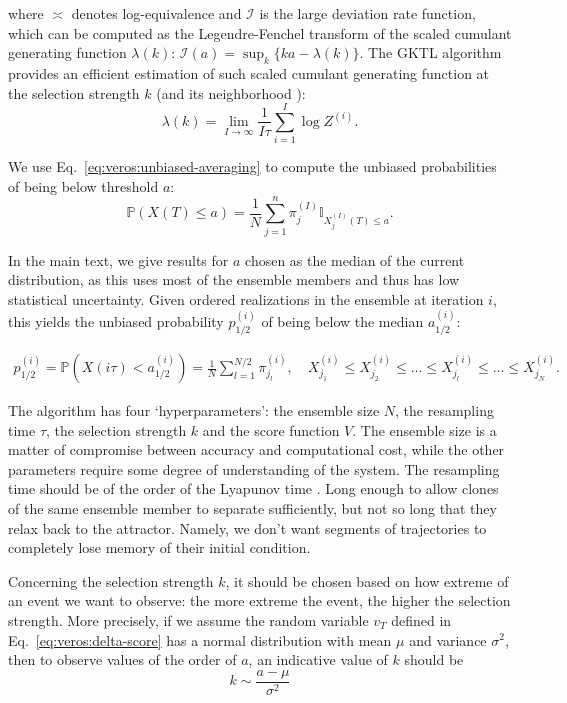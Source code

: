 where $\asymp$ denotes log-equivalence and $\mathcal{I}$ is the large deviation rate function, which can be computed as the Legendre-Fenchel transform of the scaled cumulant generating function $\lambda(k)$: $\mathcal{I}(a) = \sup_k \{ka - \lambda(k)\}$.
The GKTL algorithm provides an efficient estimation of such scaled cumulant generating function at the selection strength $k$ (and its neighborhood \cite{RAG20}):
\begin{equation}
    \lambda(k) = \lim_{I \to \infty} \frac{1}{I\tau} \sum_{i=1}^{I} \log{Z^{(i)}}.
\end{equation}


We use Eq.~\ref{eq:veros:unbiased-averaging} to compute the unbiased probabilities of being below threshold $a$: 
\begin{equation}\label{eq:veros:unbiased-probabilities}
        \mathbb{P} (X(T) \leq a) = \frac{1}{N} \sum_{j=1}^{n} \pi_j^{(I)} \mathbb{I}_{X_j^{(I)}(T) \leq a}.
\end{equation}

In the main text, we give results for $a$ chosen as the median of the current distribution, as this uses most of the ensemble members and thus has low statistical uncertainty. Given ordered realizations in the ensemble at iteration $i$, this yields the unbiased probability $p_{1/2}^{(i)}$ of being below the median $a^{(i)}_{1/2}$:

\begin{gather}\label{eq:veros:p0.5}
        p_{1/2}^{(i)} = \mathbb{P}(X(i\tau) < a^{(i)}_{1/2}) = \frac{1}{N} \sum_{l=1}^{N/2} \pi_{j_l}^{(i)}, \quad X_{j_1}^{(i)} \leq X_{j_2}^{(i)} \leq \ldots \leq X_{j_{l}}^{(i)} \leq \ldots \leq X_{j_{N}}^{(i)} .
\end{gather}

The algorithm has four `hyperparameters': the ensemble size $N$, the resampling time $\tau$, the selection strength $k$ and the score function $V$. The ensemble size is a matter of compromise between accuracy and computational cost, while the other parameters require some degree of understanding of the system. The resampling time should be of the order of the Lyapunov time \cite{WOU16}. Long enough to allow clones of the same ensemble member to separate sufficiently, but not so long that they relax back to the attractor. Namely, we don't want segments of trajectories to completely lose memory of their initial condition.

Concerning the selection strength $k$, it should be chosen based on how extreme of an event we want to observe: the more extreme the event, the higher the selection strength. More precisely, if we assume the random variable $v_T$ defined in Eq.~\ref{eq:veros:delta-score} has a normal distribution with mean $\mu$ and variance $\sigma^2$, then to observe values of the order of $a$, an indicative value of $k$ should be
\begin{equation}\label{eq:veros:suggested-k}
    k \sim \frac{a - \mu}{\sigma^2}
\end{equation}

